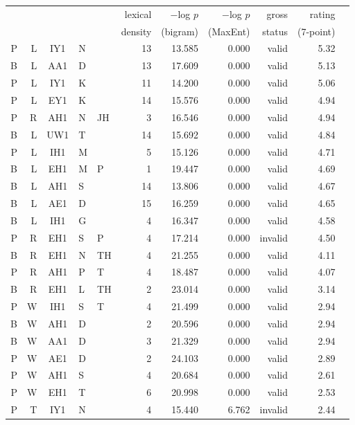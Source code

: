 \documentclass[12pt]{article}
\begin{document}
\begin{longtable}{r@{ }r@{ }c@{ }l@{ }l rrrrrr}
\toprule
   &   &     &   &    & lexical & $-$log $p$ & $-$log $p$ & gross  & rating    \\
   &   &     &   &    & density & (bigram)   & (MaxEnt)   & status & (7-point) \\
\midrule
P & L & IY1 & N &    & 13 & 13.585 & 0.000 &   valid & 5.32 \\
B & L & AA1 & D &    & 13 & 17.609 & 0.000 &   valid & 5.13 \\
P & L & IY1 & K &    & 11 & 14.200 & 0.000 &   valid & 5.06 \\
P & L & EY1 & K &    & 14 & 15.576 & 0.000 &   valid & 4.94 \\
P & R & AH1 & N & JH & 3 & 16.546 & 0.000 &   valid & 4.94 \\
B & L & UW1 & T &    & 14 & 15.692 & 0.000 &   valid & 4.84 \\
P & L & IH1 & M &    & 5 & 15.126 & 0.000 &   valid & 4.71 \\
B & L & EH1 & M &  P & 1 & 19.447 & 0.000 &   valid & 4.69 \\
B & L & AH1 & S &    & 14 & 13.806 & 0.000 &   valid & 4.67 \\
B & L & AE1 & D &    & 15 & 16.259 & 0.000 &   valid & 4.65 \\
B & L & IH1 & G &    & 4 & 16.347 & 0.000 &   valid & 4.58 \\
P & R & EH1 & S &  P & 4 & 17.214 & 0.000 & invalid & 4.50 \\
B & R & EH1 & N & TH & 4 & 21.255 & 0.000 &   valid & 4.11 \\
P & R & AH1 & P &  T & 4 & 18.487 & 0.000 &   valid & 4.07 \\
B & R & EH1 & L & TH & 2 & 23.014 & 0.000 &   valid & 3.14 \\
P & W & IH1 & S &  T & 4 & 21.499 & 0.000 &   valid & 2.94 \\
B & W & AH1 & D &    & 2 & 20.596 & 0.000 &   valid & 2.94 \\
B & W & AA1 & D &    & 3 & 21.329 & 0.000 &   valid & 2.94 \\
P & W & AE1 & D &    & 2 & 24.103 & 0.000 &   valid & 2.89 \\
P & W & AH1 & S &    & 4 & 20.684 & 0.000 &   valid & 2.61 \\
P & W & EH1 & T &    & 6 & 20.998 & 0.000 &   valid & 2.53 \\
P & T & IY1 & N &    & 4 & 15.440 & 6.762 & invalid & 2.44 \\

\end{longtable}
\end{document}
